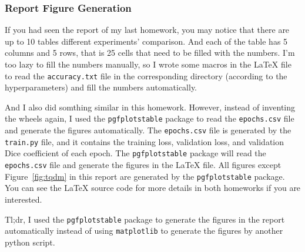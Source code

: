 \subsubsection{Report Figure Generation}

If you had seen the report of my last homework, you may notice that there are up to 10 tables different experiments' comparison.
And each of the table has 5 columns and 5 rows, that is 25 cells that need to be filled with the numbers.
I'm too lazy to fill the numbers manually, so I wrote some macros in the \LaTeX{} file to read the \texttt{accuracy.txt} file in the corresponding directory (according to the hyperparameters) and fill the numbers automatically.

And I also did somthing similar in this homework.
However, instead of inventing the wheels again, I used the \texttt{pgfplotstable} package to read the \texttt{epochs.csv} file and generate the figures automatically.
The \texttt{epochs.csv} file is generated by the \texttt{train.py} file, and it contains the training loss, validation loss, and validation Dice coefficient of each epoch.
The \texttt{pgfplotstable} package will read the \texttt{epochs.csv} file and generate the figures in the \LaTeX{} file.
All figures except Figure~\ref{fig:tqdm} in this report are generated by the \texttt{pgfplotstable} package.
You can see the \LaTeX{} source code for more details in both homeworks if you are interested.

Tl;dr, I used the \texttt{pgfplotstable} package to generate the figures in the report automatically instead of using \texttt{matplotlib} to generate the figures by another python script.
